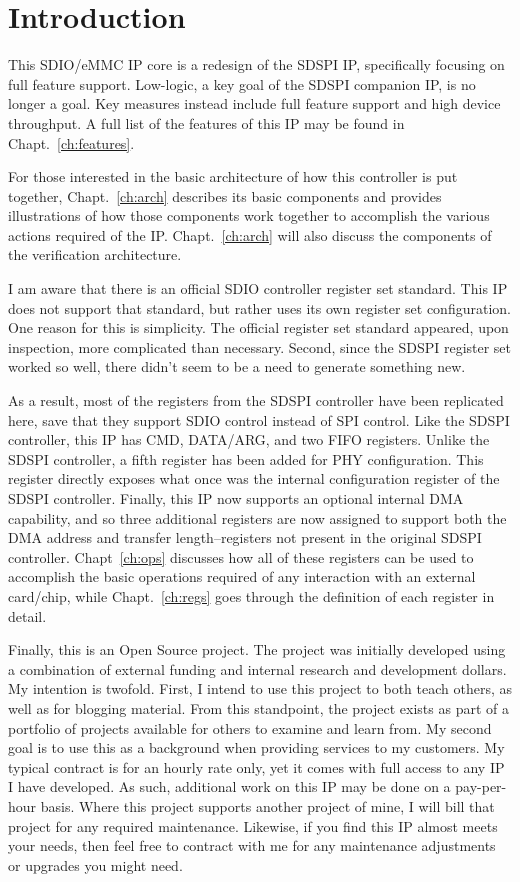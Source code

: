 \documentclass{gqtekspec}
\begin{document}
\chapter{Introduction}
\setcounter{page}{1}

This SDIO/eMMC IP core is a redesign of the SDSPI IP, specifically focusing on
full feature support.  Low-logic, a key goal of the SDSPI companion IP, is no
longer a goal.  Key measures instead include full feature support and high
device throughput.  A full list of the features of this IP may be found in
Chapt.~\ref{ch:features}.

For those interested in the basic architecture of how this controller is put
together, Chapt.~\ref{ch:arch} describes its basic components and provides
illustrations of how those components work together to accomplish the various
actions required of the IP.  Chapt.~\ref{ch:arch} will also discuss the
components of the verification architecture.

I am aware that there is an official SDIO controller register set standard.
This IP does not support that standard, but rather uses its own register set
configuration.  One reason for this is simplicity.  The official register set
standard appeared, upon inspection, more complicated than necessary.  Second,
since the SDSPI register set worked so well, there didn't seem to be a need to
generate something new.

As a result, most of the registers from the SDSPI controller have been
replicated here, save that they support SDIO control instead of SPI control.
Like the SDSPI controller, this IP has CMD, DATA/ARG, and two FIFO registers.
Unlike the SDSPI controller, a fifth register has been added for PHY
configuration.  This register directly exposes what once was the internal
configuration register of the SDSPI controller.  Finally, this IP now supports
an optional internal DMA capability, and so three additional registers are now
assigned to support both the DMA address and transfer length--registers not
present in the original SDSPI controller.  Chapt~\ref{ch:ops} discusses how
all of these registers can be used to accomplish the basic operations required
of any interaction with an external card/chip, while Chapt.~\ref{ch:regs} goes
through the definition of each register in detail.

Finally, this is an Open Source project.  The project was initially
developed using a combination of external funding and internal research and
development dollars.  My intention is twofold.  First, I intend to use this
project to both teach others, as well as for blogging material.  From this
standpoint, the project exists as part of a portfolio of projects available for
others to examine and learn from.  My second goal is to use this as a
background when providing services to my customers.  My typical contract is
for an hourly rate only, yet it comes with full access to any IP I have
developed.  As such, additional work on this IP may be done on a pay-per-hour
basis.  Where this project supports another project of mine, I will bill that
project for any required maintenance.  Likewise, if you find this IP almost
meets your needs, then feel free to contract with me for any maintenance
adjustments or upgrades you might need.
\end{document}
